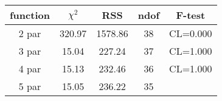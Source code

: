 \begin{tabular}{c|c|c|c|c}
function & $\chi^2$ & RSS & ndof & F-test \\
\hline
2 par & 320.97 & 1578.86 & 38 & CL=0.000 \\
3 par & 15.04 & 227.24 & 37 & CL=1.000 \\
4 par & 15.13 & 232.46 & 36 & CL=1.000 \\
5 par & 15.05 & 236.22 & 35 & \\
\hline
\end{tabular}